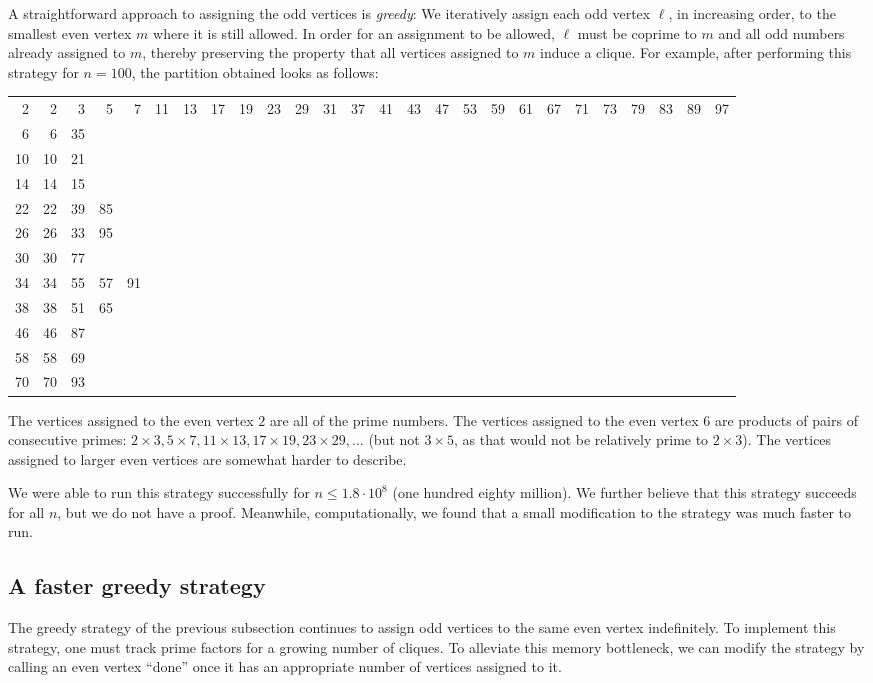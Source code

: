 \documentclass{article}
\theoremstyle{plain}
\theoremstyle{definition}
\theoremstyle{remark}
\begin{document}
A straightforward approach to assigning the odd vertices is \emph{greedy}:
We iteratively assign each odd vertex $\ell$, in increasing order, to the smallest even vertex $m$ where it is still allowed.
In order for an assignment to be allowed, $\ell$ must be coprime to $m$ and all odd numbers already assigned to $m$, thereby preserving the property that all vertices assigned to $m$ induce a clique.
For example, after performing this strategy for $n=100$, the partition obtained looks as follows:
\begin{center}
\setlength{\tabcolsep}{3pt}
\begin{tabular}{r|rrrrrrrrrrrrrrrrrrrrrrrrr}
2 & 2 & 3 & 5 & 7 & 11 & 13 & 17 & 19 & 23 & 29 & 31 & 37 & 41 & 43 & 47 & 53 & 59 & 61 & 67 & 71 & 73 & 79 & 83 & 89 & 97\\
6 & 6 & 35\\
10 & 10 & 21\\
14 & 14 & 15\\
22 & 22 & 39 & 85\\
26 & 26 & 33 & 95\\
30 & 30 & 77\\
34 & 34 & 55 & 57 & 91\\
38 & 38 & 51 & 65\\
46 & 46 & 87\\
58 & 58 & 69\\
70 & 70 & 93\\
\end{tabular}
\end{center}
The vertices assigned to the even vertex $2$ are all of the prime numbers.
The vertices assigned to the even vertex $6$ are products of pairs of consecutive primes: $2\times 3, 5\times 7, 11\times 13, 17\times 19, 23\times 29, \dotsc$ (but not $3\times 5$, as that would not be relatively prime to $2\times 3$).
The vertices assigned to larger even vertices are somewhat harder to describe.

We were able to run this strategy successfully for $n\le 1.8\cdot 10^8$ (one hundred eighty million).
We further believe that this strategy succeeds for all $n$, but we do not have a proof.
Meanwhile, computationally, we found that a small modification to the strategy was much faster to run.

\subsection{A faster greedy strategy}
\label{subsec.greedy}

The greedy strategy of the previous subsection continues to assign odd vertices to the same even vertex indefinitely.
To implement this strategy, one must track prime factors for a growing number of cliques.
To alleviate this memory bottleneck, we can modify the strategy by calling an even vertex ``done'' once it has an appropriate number of vertices assigned to it.
\end{document}
